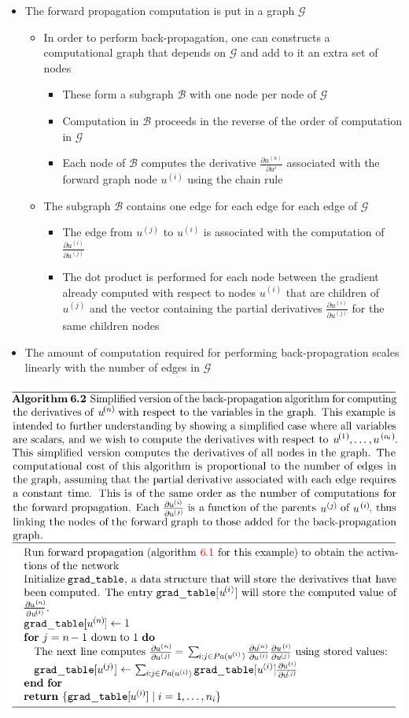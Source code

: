 \documentclass[11pt]{article}
\begin{document}
\begin{itemize}
\item The forward propagation computation is put in a graph \(\mathcal G\)
\begin{itemize}
\item In order to perform back-propagation, one can constructs a computational graph that depends on \(\mathcal G\) and add to it an extra set of nodes
\begin{itemize}
\item These form a subgraph \(\mathcal B\) with one node per node of \(\mathcal G\)
\item Computation in \(\mathcal B\) proceeds in the reverse of the order of computation in \(\mathcal G\)
\item Each node of \(\mathcal B\) computes the derivative \(\frac{\partial u^{(n)}}{\partial u^{i}}\) associated with the forward graph node \(u^{(i)}\) using the chain rule
\end{itemize}
\item The subgraph \(\mathcal B\) contains one edge for each edge for each edge of \(\mathcal G\)
\begin{itemize}
\item The edge from \(u^{(j)}\) to \(u^{(i)}\) is associated with the computation of \(\frac{\partial u^{(i)}}{\partial u ^{(j)}}\)
\item The dot product is performed for each node between the gradient already computed with respect to nodes \(u^{(i)}\) that are children of \(u^{(j)}\) and the vector containing the partial derivatives \(\frac{\partial u^{(i)}}{\partial u ^{(j)}}\) for the same children nodes
\end{itemize}
\end{itemize}

\item The amount of computation required for performing back-propagration scales linearly with the number of edges in \(\mathcal G\)
\end{itemize}

\begin{center}
\includegraphics[width=.9\linewidth]{Deep Feedforward Networks/screenshot_2018-10-02_08-18-42.png}
\end{center}
\end{document}
